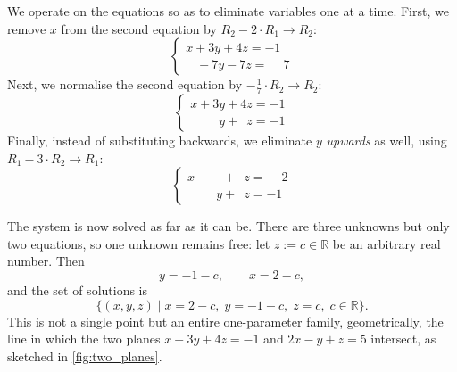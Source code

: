 We operate on the equations so as to eliminate variables one at a time. First, we remove $x$ from the second equation by $R_2 - 2 \cdot R_1 \to R_2$:
\begin{equation*}
\begin{cases}
x + 3y + 4z = -1 \\
\phantom{x} \; -7y - 7z = \phantom{-}7
\end{cases}
\end{equation*}
Next, we normalise the second equation by $-\frac{1}{7} \cdot R_2 \to R_2$:
\begin{equation*}
\begin{cases}
x + 3y + 4z = -1 \\
\phantom{x + 3}y + \phantom{4}z = -1
\end{cases}
\end{equation*}
Finally, instead of substituting backwards, we eliminate $y$ \emph{upwards} as well, using $R_1 - 3 \cdot R_2 \to R_1$:
\begin{equation*}
\begin{cases}
x \phantom{{}+ 3y} + \phantom{4}z = \phantom{-}2 \\
\phantom{x + 3}y + \phantom{4}z = -1
\end{cases}
\end{equation*}

The system is now solved as far as it can be. There are three unknowns but only two equations, so one unknown remains free: let $z := c \in \mathbb{R}$ be an arbitrary real number. Then
\[
y = -1 - c, \qquad x = 2 - c,
\]
and the set of solutions is
\begin{equation} \label{eq:motivating_solution_set}
\{(x, y, z) \mid x = 2 - c, \; y = -1 - c, \; z = c, \; c \in \mathbb{R}\}.
\end{equation}
This is not a single point but an entire one-parameter family, geometrically, the line in which the two planes $x + 3y + 4z = -1$ and $2x - y + z = 5$ intersect, as sketched in \cref{fig:two_planes}.

